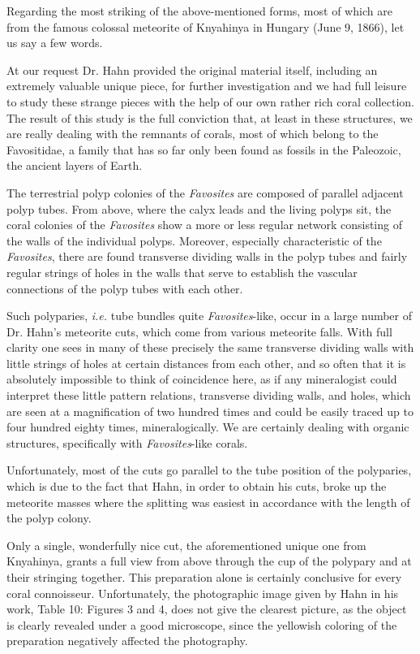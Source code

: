 \documentclass[a4paper, 12pt, oneside]{article}
\begin{document}
Regarding the most striking of the above-mentioned forms, most of which are from the famous colossal meteorite of Knyahinya in Hungary (June 9, 1866), let us say a few words.

At our request Dr. Hahn provided the original material itself, including an extremely valuable unique piece, for further investigation and we had full leisure to study these strange pieces with the help of our own rather rich coral collection. The result of this study is the full conviction that, at least in these structures, we are really dealing with the remnants of corals, most of which belong to the Favositidae, a family that has so far only been found as fossils in the Paleozoic, the ancient layers of Earth.

The terrestrial polyp colonies of the \emph{Favosites} are composed of parallel adjacent polyp tubes. From above, where the calyx leads and the living polyps sit, the coral colonies of the \emph{Favosites} show a more or less regular network consisting of the walls of the individual polyps. Moreover, especially characteristic of the \emph{Favosites}, there are found transverse dividing walls in the polyp tubes and fairly regular strings of holes in the walls that serve to establish the vascular connections of the polyp tubes with each other.

Such polyparies, \emph{i.e.} tube bundles quite \emph{Favosites}-like, occur in a large number of Dr. Hahn's meteorite cuts, which come from various meteorite falls. With full clarity one sees in many of these precisely the same transverse dividing walls with little strings of holes at certain distances from each other, and so often that it is absolutely impossible to think of coincidence here, as if any mineralogist could interpret these little pattern relations, transverse dividing walls, and holes, which are seen at a magnification of two hundred times and could be easily traced up to four hundred eighty times, mineralogically. We are certainly dealing with organic structures, specifically with \emph{Favosites}-like corals.

Unfortunately, most of the cuts go parallel to the tube position of the polyparies, which is due to the fact that Hahn, in order to obtain his cuts, broke up the meteorite masses where the splitting was easiest in accordance with the length of the polyp colony.

Only a single, wonderfully nice cut, the aforementioned unique one from Knyahinya, grants a full view from above through the cup of the polypary and at their stringing together. This preparation alone is certainly conclusive for every coral connoisseur. Unfortunately, the photographic image given by Hahn in his work, Table 10: Figures 3 and 4, does not give the clearest picture, as the object is clearly revealed under a good microscope, since the yellowish coloring of the preparation negatively affected the photography.
\end{document}
